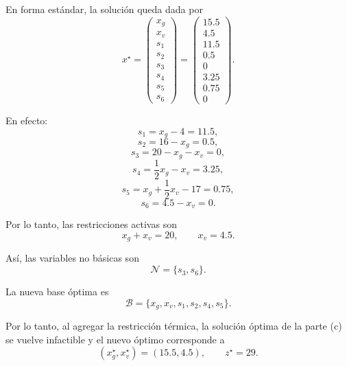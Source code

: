 \begin{enumerate}[label=\alph*)]
En forma estándar, la solución queda dada por
\[
x^\star=
\begin{pmatrix}
x_g\\
x_v\\
s_1\\
s_2\\
s_3\\
s_4\\
s_5\\
s_6
\end{pmatrix}
=
\begin{pmatrix}
15.5\\
4.5\\
11.5\\
0.5\\
0\\
3.25\\
0.75\\
0
\end{pmatrix}.
\]

En efecto:
\[
s_1=x_g-4=11.5,
\]
\[
s_2=16-x_g=0.5,
\]
\[
s_3=20-x_g-x_v=0,
\]
\[
s_4=\frac{1}{2}x_g-x_v=3.25,
\]
\[
s_5=x_g+\frac{1}{2}x_v-17=0.75,
\]
\[
s_6=4.5-x_v=0.
\]

Por lo tanto, las restricciones activas son
\[
x_g+x_v=20,
\qquad
x_v=4.5.
\]

Así, las variables no básicas son
\[
\mathcal{N}=\{s_3,s_6\}.
\]

La nueva base óptima es
\[
\mathcal{B}
=
\{x_g,x_v,s_1,s_2,s_4,s_5\}.
\]

Por lo tanto, al agregar la restricción térmica, la solución óptima de la parte (c)
se vuelve infactible y el nuevo óptimo corresponde a
\[
(x_g^\star,x_v^\star)=(15.5,4.5),
\qquad
z^\star=29.
\]

\end{enumerate}
